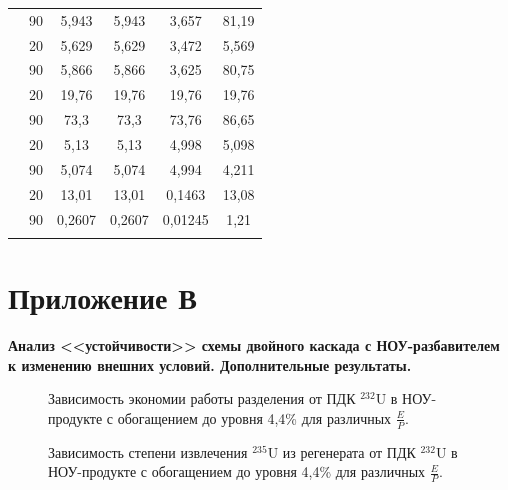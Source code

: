 \begin{table}[ht]
\begin{tabular}{|r|r||c|c|c|c|}
          & 90 & 5,943 & 5,943 & 3,657 & 81,19\\
      \Xhline{2\arrayrulewidth}
      \multirow{2}{*}{$C_{235,W_{2}}, \%$}
          & 20 & 5,629 & 5,629 & 3,472 & 5,569 \\\cline{2-6} 
          & 90 & 5,866 & 5,866 & 3,625 & 80,75\\
  \Xhline{2\arrayrulewidth}
      \multirow{2}{*}{$C_{235,P_{2}}, \%$}
          & 20 & 19,76 & 19,76 & 19,76 & 19,76 \\\cline{2-6} 
          & 90 & 73,3 & 73,3 & 73,76 & 86,65\\
      \Xhline{2\arrayrulewidth}
      \multirow{2}{*}{$C_{235,P_{n}}, \%$}
          & 20 & 5,13 & 5,13 & 4,998 & 5,098 \\\cline{2-6} 
          & 90 & 5,074 & 5,074 & 4,994 & 4,211\\
      \Xhline{2\arrayrulewidth}           
      \multirow{2}{*}{$P_2$, кг}
      & 20 & 13,01 & 13,01 & 0,1463 & 13,08 \\\cline{2-6} 
      & 90 & 0,2607 & 0,2607 & 0,01245 & 1,21\\
\Xhline{2\arrayrulewidth}
      \end{tabular}
\end{table}


\newpage

\chapter*{Приложение В}             %
\noindent

\renewcommand{\thefigure}{В\arabic{figure}}
\setcounter{figure}{0}
\renewcommand{\thetable}{В\arabic{table}}
\setcounter{table}{0}

\textbf{Анализ <<устойчивости>> схемы двойного каскада с НОУ-разбавителем к изменению внешних условий. Дополнительные результаты.}

\begin{figure}
    \centering
    \begin{minipage}{.5\textwidth}
      \centering
      
      \caption{{Зависимость экономии работы разделения от ПДК $^{232}$U в НОУ-продукте с обогащением до уровня 4,4\% для различных $\frac{E}{P}$.{\label{sw44}}}}
    \end{minipage}%
    \begin{minipage}{.5\textwidth}
      \centering
      
      \caption{{Зависимость степени извлечения $^{235}$U из регенерата от ПДК $^{232}$U в НОУ-продукте с обогащением до уровня 4,4\% для различных $\frac{E}{P}$.{\label{exR44}}}}
    \end{minipage}
\end{figure}


